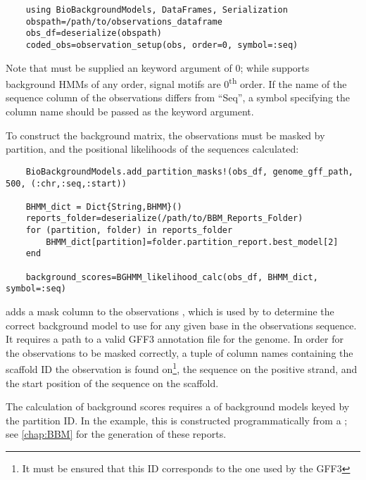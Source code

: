 \begin{verbatim}
    using BioBackgroundModels, DataFrames, Serialization
    obspath=/path/to/observations_dataframe
    obs_df=deserialize(obspath)
    coded_obs=observation_setup(obs, order=0, symbol=:seq)\end{verbatim}

Note that  must be supplied an  keyword argument of 0; while  supports background HMMs of any order, signal motifs are 0\textsuperscript{th} order. If the name of the sequence column of the observations  differs from ``Seq'', a symbol specifying the column name should be passed as the  keyword argument.

To construct the background matrix, the observations must be masked by partition, and the positional likelihoods of the sequences calculated:

\begin{verbatim}
    BioBackgroundModels.add_partition_masks!(obs_df, genome_gff_path, 500, (:chr,:seq,:start))

    BHMM_dict = Dict{String,BHMM}()
    reports_folder=deserialize(/path/to/BBM_Reports_Folder)
    for (partition, folder) in reports_folder
        BHMM_dict[partition]=folder.partition_report.best_model[2]
    end

    background_scores=BGHMM_likelihood_calc(obs_df, BHMM_dict, symbol=:seq)\end{verbatim}

 adds a mask column to the observations , which is used by  to determine the correct background model to use for any given base in the observations sequence. It requires a path to a valid GFF3 annotation file for the genome. In order for the observations to be masked correctly, a tuple of column names containing the scaffold ID the observation is found on\footnote{It must be ensured that this ID corresponds to the one used by the GFF3}, the sequence on the positive strand, and the start position of the sequence on the scaffold.

The calculation of background scores requires a  of  background models keyed by the partition ID. In the example, this is constructed programmatically from a ; see \autoref{chap:BBM} for the generation of these reports.

